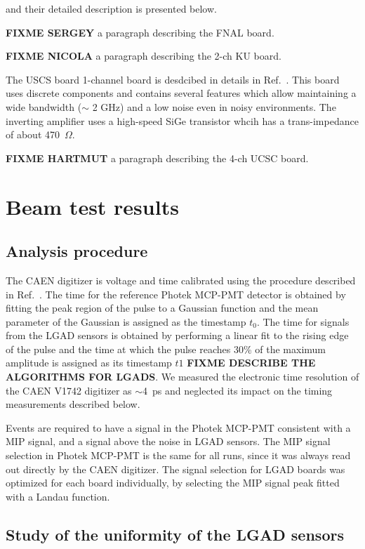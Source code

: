 \documentclass[preprint,1p]{elsarticle}
\begin{document}
and their detailed description is presented below.  

\textbf {FIXME SERGEY} a paragraph describing the FNAL board. 

\textbf {FIXME NICOLA} a paragraph describing the 2-ch KU board. 

The USCS board 1-channel board is desdcibed in details in Ref.~\cite{Cartiglia201783}. This board uses discrete components and contains several features which allow maintaining a wide bandwidth ($\sim$ 2 GHz) and a low noise even in noisy environments. The inverting amplifier uses a high-speed SiGe transistor whcih has a trans-impedance of about 470~$\Omega$. 

\textbf {FIXME HARTMUT} a paragraph describing the 4-ch UCSC board. 


\section{Beam test results}

\subsection{Analysis procedure}

The CAEN digitizer is voltage and time calibrated using the procedure described
in Ref.~\cite{Kim201467}. The time for the reference Photek MCP-PMT detector is
obtained by fitting the peak region of the pulse to a Gaussian function and the
mean parameter of the Gaussian is assigned as the timestamp $t_0$. The time for
signals from the LGAD sensors is obtained by performing a linear fit to the
rising edge of the pulse and the time at which the pulse reaches 30\% of the
maximum amplitude is assigned as its timestamp $t1$ \textbf{FIXME DESCRIBE THE
ALGORITHMS FOR LGADS}. We measured the electronic time resolution of the CAEN
V1742 digitizer as $\sim$4~ps and neglected its impact on the timing
measurements described below. 

Events are required to have a signal in the Photek MCP-PMT consistent with a MIP
signal, and a signal above the noise in LGAD sensors. The MIP signal selection
in Photek MCP-PMT is the same for all runs, since it was always read out
directly by the CAEN digitizer. The signal selection for LGAD boards was
optimized for each board individually, by selecting the MIP signal peak fitted
with a Landau function. 

\subsection{Study of the uniformity of the LGAD sensors}
\end{document}
